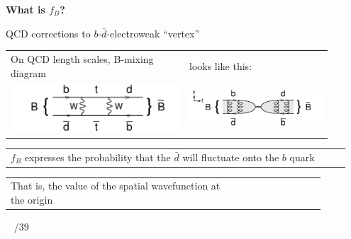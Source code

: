 \documentclass[landscape]{article}
\newenvironment{slide}[1][ ]{}{\mbox{ } \hfill \arabic{page}/39 \pagebreak}
\begin{document}

\begin{slide}
{\Huge \bf What is $f_B$?}

\vspace{0.75 cm}
QCD corrections to $b$-$\bar{d}$-electroweak ``vertex''

\vfill
\renewcommand{\arraystretch}{2}
\begin{tabular}{p{0.5\linewidth} p{0.4\linewidth}}
\begin{minipage}{\linewidth} On QCD length scales, B-mixing diagram \end{minipage} &
\begin{minipage}{\linewidth} looks like this: \end{minipage} \\
\begin{minipage}{\linewidth} \includegraphics[width=12 cm]{diagram_Bmix_box} \end{minipage} &
\begin{minipage}{\linewidth} \includegraphics[width=12 cm]{diagram_Bmix} \end{minipage} \\
\end{tabular}

\vfill
\begin{tabular}{p{0.9\linewidth} p{0.05\linewidth}}
$f_B$ expresses the probability that the $\bar{d}$ will fluctuate onto the $b$ quark
\end{tabular}

\begin{tabular}{p{0.65\linewidth} p{0.23\linewidth}}
\begin{minipage}{\linewidth}

That is, the value of the spatial wavefunction at the origin


\end{minipage}
\end{tabular}
\end{slide}
\end{document}
